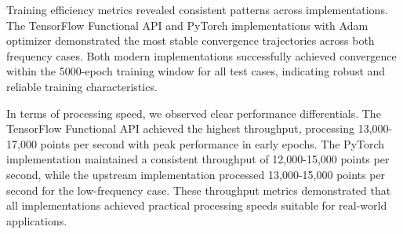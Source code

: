 \documentclass[10pt,journal,compsoc,onecolumn]{IEEEtran}
\begin{document}
Training efficiency metrics revealed consistent patterns across implementations. The TensorFlow Functional API and PyTorch implementations with Adam optimizer demonstrated the most stable convergence trajectories across both frequency cases. Both modern implementations successfully achieved convergence within the 5000-epoch training window for all test cases, indicating robust and reliable training characteristics.

In terms of processing speed, we observed clear performance differentials. The TensorFlow Functional API achieved the highest throughput, processing 13,000-17,000 points per second with peak performance in early epochs. The PyTorch implementation maintained a consistent throughput of 12,000-15,000 points per second, while the upstream implementation processed 13,000-15,000 points per second for the low-frequency case. These throughput metrics demonstrated that all implementations achieved practical processing speeds suitable for real-world applications.
\end{document}
